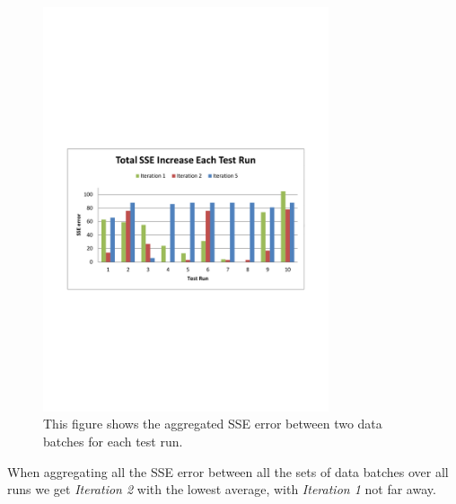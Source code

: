\begin{figure}[ht]
\centering
\includegraphics[trim = 10mm 90mm 10mm 100mm, clip, width=0.75\textwidth]{Figures/experiments/gen_TotalSSEIncreaseEachTestRun.pdf}
\caption{This figure shows the aggregated SSE error between two data batches for each test run.}
\label{fig:results_gen_TotalSSEIncreaseEachTestRun}
\end{figure}

When aggregating all the SSE error between all the sets of data batches over all runs we get \textit{Iteration 2} with the lowest average, with \textit{Iteration 1} not far away.

